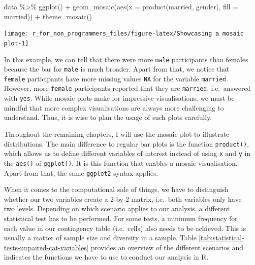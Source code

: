 \documentclass[
]{book}
\newenvironment{Shaded}{\begin{snugshade}}{\end{snugshade}}
\newcommand{\AttributeTok}[1]{\textcolor[rgb]{0.77,0.63,0.00}{#1}}
\newcommand{\FunctionTok}[1]{\textcolor[rgb]{0.00,0.00,0.00}{#1}}
\newcommand{\NormalTok}[1]{#1}
\newcommand{\SpecialCharTok}[1]{\textcolor[rgb]{0.00,0.00,0.00}{#1}}
\begin{document}
\begin{Shaded}
\begin{Highlighting}[]
\NormalTok{data }\SpecialCharTok{\%\textgreater{}\%}
  \FunctionTok{ggplot}\NormalTok{() }\SpecialCharTok{+}
  \FunctionTok{geom\_mosaic}\NormalTok{(}\FunctionTok{aes}\NormalTok{(}\AttributeTok{x =} \FunctionTok{product}\NormalTok{(married, gender),}
                  \AttributeTok{fill =}\NormalTok{ married)) }\SpecialCharTok{+}
  \FunctionTok{theme\_mosaic}\NormalTok{()}
\end{Highlighting}
\end{Shaded}

\begin{center}\texttt{[image: r\_for\_non\_programmers\_files/figure-latex/Showcasing a mosaic plot-1]} \end{center}

In this example, we can tell that there were more \texttt{male} participants than females because the bar for \texttt{male} is much broader. Apart from that, we notice that \texttt{female} participants have more missing values \texttt{NA} for the variable \texttt{married}. However, more \texttt{female} participants reported that they are \texttt{married}, i.e.~answered with \texttt{yes}. While mosaic plots make for impressive visualisations, we must be mindful that more complex visualisations are always more challenging to understand. Thus, it is wise to plan the usage of such plots carefully.

Throughout the remaining chapters, I will use the mosaic plot to illustrate distributions. The main difference to regular bar plots is the function \texttt{product()}, which allows us to define different variables of interest instead of using \texttt{x} and \texttt{y} in the \texttt{aes()} of \texttt{ggplot()}. It is this function that enables a mosaic visualisation. Apart from that, the same \texttt{ggplot2} syntax applies.

When it comes to the computational side of things, we have to distinguish whether our two variables create a 2-by-2 matrix, i.e.~both variables only have two levels. Depending on which scenario applies to our analysis, a different statistical test has to be performed. For some tests, a minimum frequency for each value in our contingency table (i.e.~cells) also needs to be achieved. This is usually a matter of sample size and diversity in a sample. Table \ref{tab:statistical-tests-unpaired-cat-variables} provides an overview of the different scenarios and indicates the functions we have to use to conduct our analysis in R.
\end{document}
